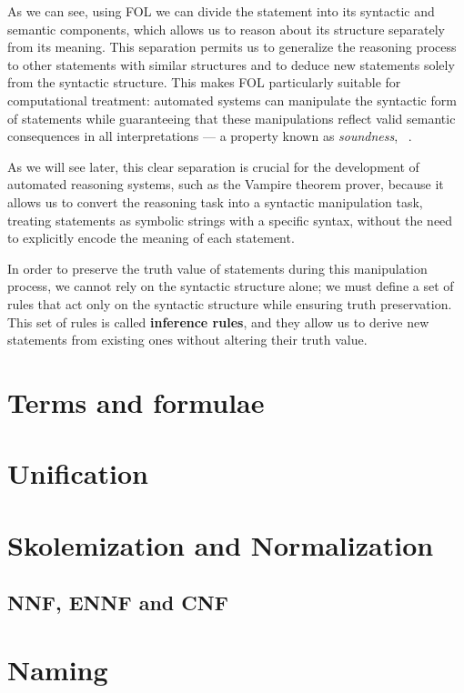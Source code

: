 As we can see, using FOL we can divide the statement into its syntactic and semantic components, which allows us to reason about its structure separately from its meaning.
This separation permits us to generalize the reasoning process to other statements with similar structures and to deduce new statements solely from the syntactic structure.
This makes FOL particularly suitable for computational treatment: automated systems can manipulate the syntactic form of statements while guaranteeing that these manipulations reflect valid semantic consequences in all interpretations — a property known as \textit{soundness}, \citeauthor{enderton2001}~\cite{enderton2001}.

As we will see later, this clear separation is crucial for the development of automated reasoning systems, such as the Vampire theorem prover, because it allows us to convert the reasoning task into a syntactic manipulation task, treating statements as symbolic strings with a specific syntax, without the need to explicitly encode the meaning of each statement.

In order to preserve the truth value of statements during this manipulation process, we cannot rely on the syntactic structure alone; we must define a set of rules that act only on the syntactic structure while ensuring truth preservation.
This set of rules is called \textbf{inference rules}, and they allow us to derive new statements from existing ones without altering their truth value.
\section{Terms and formulae}

\section{Unification}

\section{Skolemization and Normalization}
\subsection{NNF, ENNF and CNF}

\section{Naming}

